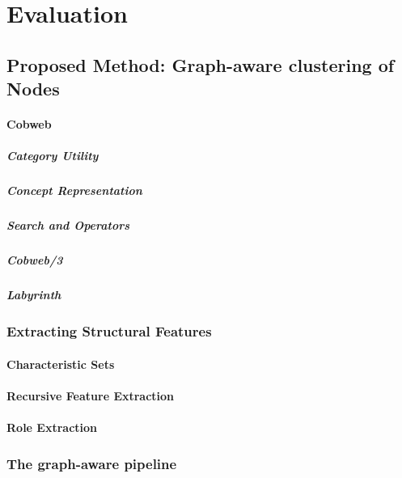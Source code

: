  \chapter{Evaluation}
 \section{Proposed Method: Graph-aware clustering of Nodes}
 
\subsubsection{Cobweb}\label{\positionnumber}
\paragraph{Category Utility}
\paragraph{Concept Representation}
\paragraph{Search and Operators}

\paragraph{Cobweb/3}

\paragraph{Labyrinth}

\subsection{Extracting Structural Features}
\subsubsection{Characteristic Sets}
\subsubsection{Recursive Feature Extraction}
\subsubsection{Role Extraction}

\subsection{The graph-aware pipeline}

